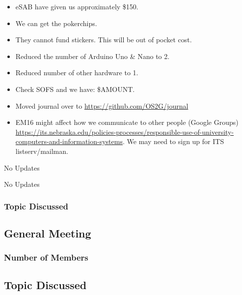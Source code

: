 \begin{itemize}
    \item eSAB have given us approximately \$150. 
    \item We can get the pokerchips.
    \item They cannot fund stickers. This will be out of pocket cost.
    \item Reduced the number of Arduino Uno \& Nano to 2.
    \item Reduced number of other hardware to 1.
    \item Check SOFS and we have: \$AMOUNT.
    \item Moved journal over to \href{https://github.com/OS2G/journal}{https://github.com/OS2G/journal}
    \item EM16 might affect how we communicate to other people (Google Groups) \href{https://its.nebraska.edu/policies-processes/responsible-use-of-university-computers-and-information-systems}{https://its.nebraska.edu/policies-processes/responsible-use-of-university-computers-and-information-systems}.
    We may need to sign up for ITS listserv/mailman.
\end{itemize}

\textbf{\primaryprogrammer}

No Updates

\textbf{\secretary}

No Updates

\subsubsection{Topic Discussed}


\subsection{General Meeting}
\subsubsection{Number of Members}
\subsection{Topic Discussed}